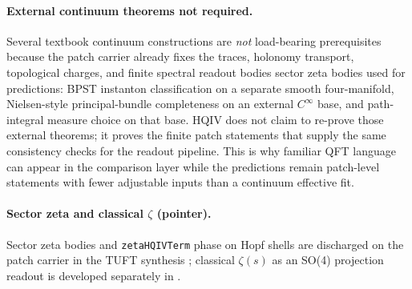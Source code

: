\paragraph{External continuum theorems not required.}
Several textbook continuum constructions are \emph{not} load-bearing prerequisites
because the patch carrier already fixes the traces, holonomy transport, topological
charges, and
\ifdefined\patchOmitZeta
finite spectral readout bodies
\else
sector zeta bodies
\fi
used for predictions: BPST instanton classification
on a separate smooth four-manifold, Nielsen-style principal-bundle completeness on
an external $C^\infty$ base, and path-integral measure choice on that base.  HQIV
does not claim to re-prove those external theorems; it proves the finite patch
statements that supply the same consistency checks for the readout pipeline.  This
is why familiar QFT language can appear in the comparison layer while the
predictions remain patch-level statements with fewer adjustable inputs than a
continuum effective fit.

\ifdefined\patchOmitZeta
\else
\ifdefined\patchBriefMode
\paragraph{Sector zeta and classical $\zeta$ (pointer).}
Sector zeta bodies and \texttt{zetaHQIVTerm} phase on Hopf shells are discharged on
the patch carrier in the TUFT synthesis \cite{hqiv-tuft-sm-lagrangian-paper};
classical $\zeta(s)$ as an SO(4) projection readout is developed separately in
\cite{hqiv-s3-zeta-so4-paper}.
\else
